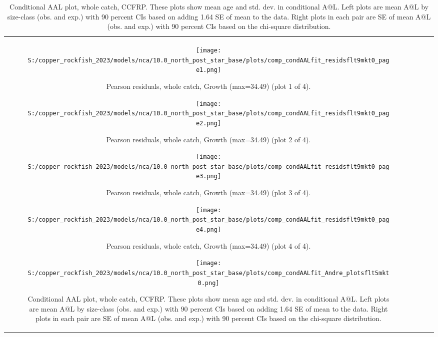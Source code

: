 \documentclass[11pt,
  letterpaper,
]{article}
\begin{document}
\begin{longtable}[t]{c>{\centering\arraybackslash}p{2cm}>{\centering\arraybackslash}p{2cm}>{\centering\arraybackslash}p{2cm}}
\begin{figure}
{\centering
\texttt{[image: S:/copper\_rockfish\_2023/models/nca/10.0\_north\_post\_star\_base/plots/comp\_condAALfit\_residsflt9mkt0\_page1.png]}
}
\caption{Pearson residuals, whole catch, Growth (max=34.49) (plot 1 of 4).\label{fig:comp-condAALfit-residsflt9mkt0-page1}}
\end{figure}

\begin{figure}
{\centering
\texttt{[image: S:/copper\_rockfish\_2023/models/nca/10.0\_north\_post\_star\_base/plots/comp\_condAALfit\_residsflt9mkt0\_page2.png]}
}
\caption{Pearson residuals, whole catch, Growth (max=34.49) (plot 2 of 4).\label{fig:comp-condAALfit-residsflt9mkt0-page2}}
\end{figure}

\begin{figure}
{\centering
\texttt{[image: S:/copper\_rockfish\_2023/models/nca/10.0\_north\_post\_star\_base/plots/comp\_condAALfit\_residsflt9mkt0\_page3.png]}
}
\caption{Pearson residuals, whole catch, Growth (max=34.49) (plot 3 of 4).\label{fig:comp-condAALfit-residsflt9mkt0-page3}}
\end{figure}

\begin{figure}
{\centering
\texttt{[image: S:/copper\_rockfish\_2023/models/nca/10.0\_north\_post\_star\_base/plots/comp\_condAALfit\_residsflt9mkt0\_page4.png]}
}
\caption{Pearson residuals, whole catch, Growth (max=34.49) (plot 4 of 4).\label{fig:comp-condAALfit-residsflt9mkt0-page4}}
\end{figure}

\begin{figure}
{\centering
\texttt{[image: S:/copper\_rockfish\_2023/models/nca/10.0\_north\_post\_star\_base/plots/comp\_condAALfit\_Andre\_plotsflt5mkt0.png]}
}
\caption{Conditional AAL plot, whole catch, CCFRP. These plots show mean age and std. dev. in conditional A@L. Left plots are mean A@L by size-class (obs. and exp.) with 90 percent CIs based on adding 1.64 SE of mean to the data. Right plots in each pair are SE of mean A@L (obs. and exp.) with 90 percent CIs based on the chi-square distribution.\label{fig:comp-condAALfit-Andre-plotsflt5mkt0}}
\end{figure}


\end{longtable}
\end{document}
